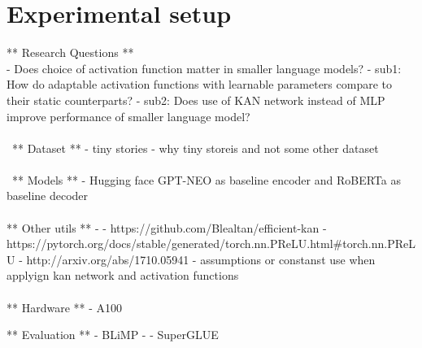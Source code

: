 
\section{Experimental setup}

** Research Questions **
\\
- Does choice of activation function matter in smaller language models?
- sub1: How do adaptable activation functions with learnable parameters compare to their static counterparts?
- sub2: Does use of KAN network instead of MLP improve performance of smaller language model?
\\\\\
** Dataset ** 
- tiny stories
- why tiny storeis and not some other dataset 
\\\\\
** Models ** 
- Hugging face GPT-NEO as baseline encoder and RoBERTa as baseline decoder
\\\\
** Other utils ** 
- %
- https://github.com/Blealtan/efficient-kan
- https://pytorch.org/docs/stable/generated/torch.nn.PReLU.html#torch.nn.PReLU
- http://arxiv.org/abs/1710.05941
- assumptions or constanst use when applyign kan network and activation functions 
\\\\
** Hardware ** 
- A100

** Evaluation ** 
- BLiMP - %
- SuperGLUE